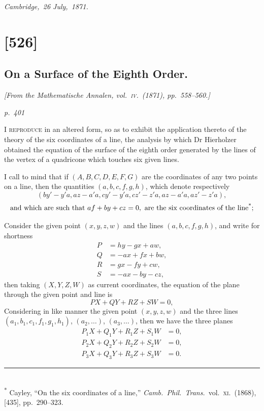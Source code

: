 \documentclass[11pt,a4paper]{article}
\theoremstyle{plain}
\theoremstyle{definition}
\begin{document}
\noindent\textit{Cambridge,\ 26 July,\ 1871.}

\clearpage

\section{[526]}
\subsection{On a Surface of the Eighth Order.}

\begin{center}
\textit{[From the Mathematische Annalen, vol.~\textsc{iv}.\ (1871), pp.~558--560.]}
\end{center}

\textit{p.~401}

\noindent
\textsc{I reproduce} in an altered form, so as to exhibit the application thereto of the
theory of the six coordinates of a line, the analysis by which Dr Hierholzer obtained
the equation of the surface of the eighth order generated by the lines of the vertex of a
quadricone which touches six given lines.

I call to mind that if $(A, B, C, D, E, F, G)$ are the coordinates of any two
points on a line, then the quantities $(a, b, c, f, g, h)$, which denote respectively
\[
(by' - y'a, az - a'a, cy' - y'a, cz' - z'a, az - a'a, az' - z'a),
\]
\[
\text{and which are such that } af + by + cz = 0, \text{ are the six coordinates of the line\textsuperscript{*};}
\]

Consider the given point $(x, y, z, w)$ and the lines $(a, b, c, f, g, h)$, and write
for shortness
\[
\begin{aligned}
P &= hy - g x + a w, \\
Q &= -ax + f x + b w, \\
R &= g x - f y + c w, \\
S &= -ax - b y - c z,
\end{aligned}
\]
then taking $(X, Y, Z, W)$ as current coordinates, the equation of the plane through
the given point and line is
\[
P X + Q Y + R Z + S W = 0,
\]
\noindent\hfill
Considering in like manner the given point $(x, y, z, w)$ and the three lines
$(a_1, b_1, c_1, f_1, g_1, h_1)$, $(a_2, \ldots)$, $(a_3, \ldots)$, then we have the three planes
\begin{align*}
P_1 X + Q_1 Y + R_1 Z + S_1 W &= 0, \\
P_2 X + Q_2 Y + R_2 Z + S_2 W &= 0, \\
P_3 X + Q_3 Y + R_3 Z + S_3 W &= 0.
\end{align*}
\noindent\rule{0.45\textwidth}{0.4pt}\\
\footnotesize\textsuperscript{*} Cayley, ``On the six coordinates of a line,'' \textit{Camb.\ Phil.\ Trans.}\ vol.\ \textsc{xi}.\ (1868), [435], pp.\ 290--323.\normalsize
\end{document}
